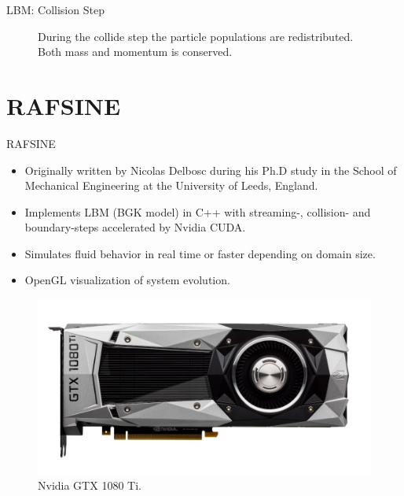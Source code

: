 \documentclass{beamer}
\begin{document}
\begin{frame}{LBM: Collision Step}
\begin{figure}[!htb]
\centering
\begin{minipage}[t]{.45\textwidth}
	\centering
	\begin{footnotesize}
	\def\svgwidth{0.9\linewidth}
	
	\end{footnotesize}
	\caption{Collision step, representing diffusion in a fluid. Particles from adjacent sites collide locally in the current site (see BGK).}
	\label{fig:d2q9_5}
\end{minipage}\qquad%
\begin{minipage}[t]{.45\textwidth}
	\centering
	\begin{small}
	\def\svgwidth{0.9\linewidth}
	
	\end{small}
	\caption{During the collide step the particle populations are redistributed. Both mass and momentum is conserved.}
	\label{fig:d2q9_6}
\end{minipage}
\end{figure}
\end{frame}

\section{RAFSINE}
\begin{frame}{RAFSINE}

\begin{itemize}
\item Originally written by Nicolas Delbosc during his Ph.D study in the School of Mechanical Engineering at the
University of Leeds, England.
\item Implements LBM (BGK model) in C++ with streaming-, collision- and boundary-steps accelerated by Nvidia CUDA.
\item Simulates fluid behavior in real time or faster depending on domain size.
\item OpenGL visualization of system evolution.
\end{itemize}

\begin{figure}[ht]
\begin{center}
\includegraphics[width=0.5\linewidth]{1080ti.jpg}
\end{center}
\caption{Nvidia GTX 1080 Ti.}
\end{figure}

\end{frame}
\end{document}
